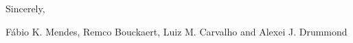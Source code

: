 \documentclass[12pt,a4paper]{article}
\begin{document}
\vspace{0.25cm}

\begin{flushright}
Sincerely,

\vspace{.5cm}

F\'{a}bio K. Mendes, Remco Bouckaert, Luiz M. Carvalho and Alexei J. Drummond
\end{flushright}
\end{document}
